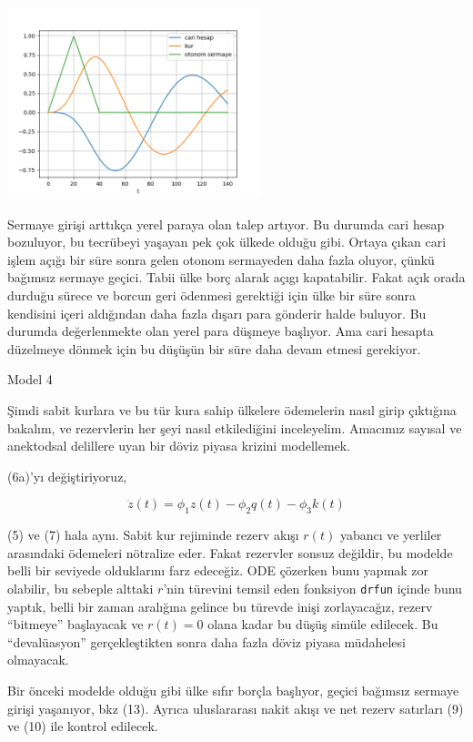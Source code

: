 \documentclass[12pt,fleqn]{article}\usepackage{../../common}
\begin{document}
\includegraphics[width=20em]{mod3.png}

Sermaye girişi arttıkça yerel paraya olan talep artıyor. Bu durumda cari
hesap bozuluyor, bu tecrübeyi yaşayan pek çok ülkede olduğu gibi. Ortaya
çıkan cari işlem açığı bir süre sonra gelen otonom sermayeden daha fazla
oluyor, çünkü bağımsız sermaye geçici. Tabii ülke borç alarak açıgı
kapatabilir. Fakat açık orada durduğu sürece ve borcun geri ödenmesi
gerektiği için ülke bir süre sonra kendisini içeri aldığından daha fazla
dışarı para gönderir halde buluyor. Bu durumda değerlenmekte olan yerel
para düşmeye başlıyor. Ama cari hesapta düzelmeye dönmek için bu düşüşün
bir süre daha devam etmesi gerekiyor.

Model 4

Şimdi sabit kurlara ve bu tür kura sahip ülkelere ödemelerin nasıl girip
çıktığına bakalım, ve rezervlerin her şeyi nasıl etkilediğini
inceleyelim. Amacımız sayısal ve anektodsal delillere uyan bir döviz piyasa
krizini modellemek.

(6a)'yı değiştiriyoruz, 

$$
\dot{z}(t) = \phi_1 z(t) - \phi_2 q(t) - \phi_3 k(t)
$$

(5) ve (7) hala aynı. Sabit kur rejiminde rezerv akışı $r(t)$ yabancı ve
yerliler arasındaki ödemeleri nötralize eder. Fakat rezervler sonsuz
değildir, bu modelde belli bir seviyede olduklarını farz edeceğiz. ODE
çözerken bunu yapmak zor olabilir, bu sebeple alttaki $r$'nin türevini
temsil eden fonksiyon \verb!drfun! içinde bunu yaptık, belli bir zaman
aralığına gelince bu türevde inişi zorlayacağız, rezerv ``bitmeye''
başlayacak ve $r(t)=0$ olana kadar bu düşüş simüle edilecek. Bu
``devalüasyon'' gerçekleştikten sonra daha fazla döviz piyasa müdahelesi
olmayacak. 

Bir önceki modelde olduğu gibi ülke sıfır borçla başlıyor, geçici bağımsız
sermaye girişi yaşanıyor, bkz (13). Ayrıca uluslararası nakit akışı ve net
rezerv satırları (9) ve (10) ile kontrol edilecek.
\end{document}
